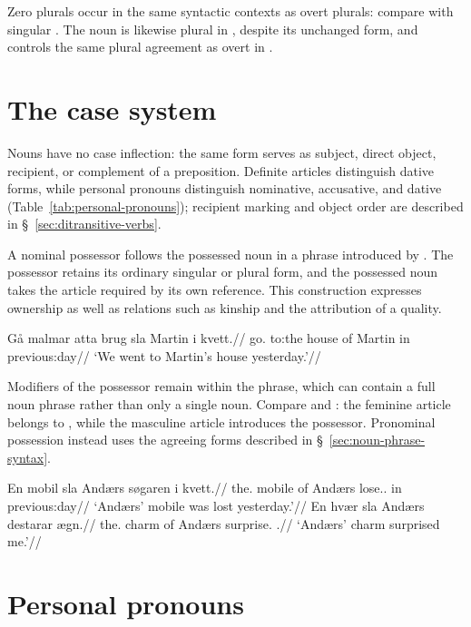 Zero plurals occur in the same syntactic contexts as overt plurals: compare  with singular . The noun is likewise plural in , despite its unchanged form, and controls the same plural agreement as overt  in .

\section{The case system}
\label{sec:nominal-case}

Nouns have no case inflection: the same form serves as subject, direct object, recipient, or complement of a preposition. Definite articles distinguish dative forms, while personal pronouns distinguish nominative, accusative, and dative (Table~\ref{tab:personal-pronouns}); recipient marking and object order are described in \S~\ref{sec:ditransitive-verbs}.

A nominal possessor follows the possessed noun in a phrase introduced by . The possessor retains its ordinary singular or plural form, and the possessed noun takes the article required by its own reference. This construction expresses ownership as well as relations such as kinship and the attribution of a quality.

\pex
\begingl
\gla Gå malmar atta brug sla Martin i kvett.//
\glb \First\Pl{} go.\Pst{} to:the house of Martin in previous:day//
\glft `We went to Martin's house yesterday.'//
\endgl
\xe

Modifiers of the possessor remain within the  phrase, which can contain a full noun phrase rather than only a single noun. Compare  and : the feminine article belongs to , while the masculine article introduces the possessor. Pronominal possession instead uses the agreeing forms described in \S~\ref{sec:noun-phrase-syntax}.

\pex
\a
\begingl
\gla En mobil sla Andærs søgaren i kvett.//
\glb the.\M{} mobile of Andærs lose.\Pst{}.\Pass{} in previous:day//
\glft `Andærs' mobile was lost yesterday.'//
\endgl
\a
\begingl
\gla En hvær sla Andærs destarar ægn.//
\glb the.\M{} charm of Andærs surprise.\Pst{} \First{}\Sg{}.\Acc{}//
\glft `Andærs' charm surprised me.'//
\endgl
\xe

\section{Personal pronouns}
\label{sec:personal-pronouns}

